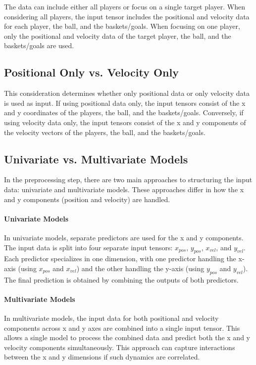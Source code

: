 The data can include either all players or focus on a single target player. When considering all players, the input tensor includes the positional and velocity data for each player, the ball, and the baskets/goals. When focusing on one player, only the positional and velocity data of the target player, the ball, and the baskets/goals are used.

\subsection{Positional Only vs. Velocity Only}

This consideration determines whether only positional data or only velocity data is used as input. If using positional data only, the input tensors consist of the x and y coordinates of the players, the ball, and the baskets/goals. Conversely, if using velocity data only, the input tensors consist of the x and y components of the velocity vectors of the players, the ball, and the baskets/goals.

\subsection{Univariate vs. Multivariate Models}

In the preprocessing step, there are two main approaches to structuring the input data: univariate and multivariate models. These approaches differ in how the x and y components (position and velocity) are handled.

\paragraph{Univariate Models}
In univariate models, separate predictors are used for the x and y components. The input data is split into four separate input tensors: \(x_{pos}\), \(y_{pos}\), \(x_{vel}\), and \(y_{vel}\). Each predictor specializes in one dimension, with one predictor handling the x-axis (using \(x_{pos}\) and \(x_{vel}\)) and the other handling the y-axis (using \(y_{pos}\) and \(y_{vel}\)). The final prediction is obtained by combining the outputs of both predictors.

\paragraph{Multivariate Models}
In multivariate models, the input data for both positional and velocity components across x and y axes are combined into a single input tensor. This allows a single model to process the combined data and predict both the x and y velocity components simultaneously. This approach can capture interactions between the x and y dimensions if such dynamics are correlated.

